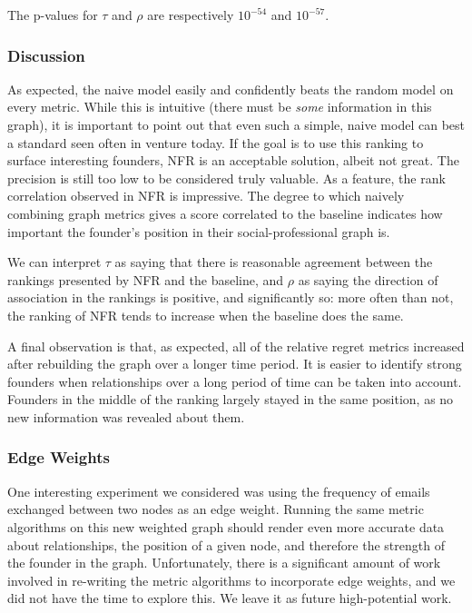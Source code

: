 The p-values for $\tau$ and $\rho$ are respectively $10^{-54}$ and $10^{-57}$.

\subsubsection{Discussion}

As expected, the naive model easily and confidently beats the random model on every metric. While this is intuitive (there must be \textit{some} information in this graph), it is important to point out that even such a simple, naive model can best a standard seen often in venture today. If the goal is to use this ranking to surface interesting founders, NFR is an acceptable solution, albeit not great. The precision is still too low to be considered truly valuable. As a feature, the rank correlation observed in NFR is impressive. The degree to which naively combining graph metrics gives a score correlated to the baseline indicates how important the founder's position in their social-professional graph is.

We can interpret $\tau$ as saying that there is reasonable agreement between the rankings presented by NFR and the baseline, and $\rho$ as saying the direction of association in the rankings is positive, and significantly so: more often than not, the ranking of NFR tends to increase when the baseline does the same.

A final observation is that, as expected, all of the relative regret metrics increased after rebuilding the graph over a longer time period. It is easier to identify strong founders when relationships over a long period of time can be taken into account. Founders in the middle of the ranking largely stayed in the same position, as no new information was revealed about them.

\subsubsection{Edge Weights}

One interesting experiment we considered was using the frequency of emails exchanged between two nodes as an edge weight. Running the same metric algorithms on this new weighted graph should render even more accurate data about relationships, the position of a given node, and therefore the strength of the founder in the graph. Unfortunately, there is a significant amount of work involved in re-writing the metric algorithms to incorporate edge weights, and we did not have the time to explore this. We leave it as future high-potential work.


